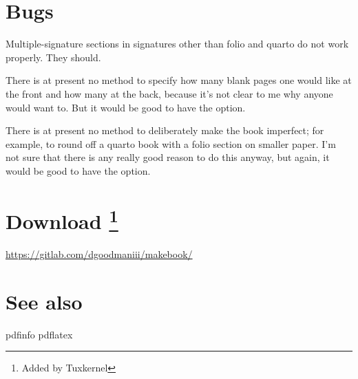 \documentclass[12pt,twoside,final]{extarticle}
\let\oldfootnote\footnote
\renewcommand\footnote[1]{%
\oldfootnote{\hspace{1mm}#1}}
\begin{document}
\section{Bugs}
Multiple-signature sections in signatures other than folio and quarto do not work properly. They should.

There is at present no method to specify how many blank pages one would like at the front and how many at  the back, because it's not clear to me why anyone would want to. But it would be good to have the option.

There is at present no method to deliberately make the book imperfect; for example, to round off a quarto book with a folio section on smaller paper. I'm not sure that there is any really good reason to do this anyway, but again, it would be good to have the option.
\section{Download\protect\footnote{Added by Tuxkernel}}
\href{https://gitlab.com/dgoodmaniii/makebook/}{https://gitlab.com/dgoodmaniii/makebook/} 
\section{See also}
pdfinfo pdflatex
\end{document}
